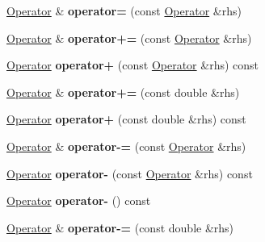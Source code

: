 \begin{DoxyCompactItemize}
\item 
\hypertarget{classOperator_afad114ba9dee8b9c08af0b5d27c3ba86}{\hyperlink{classOperator}{Operator} \& {\bfseries operator=} (const \hyperlink{classOperator}{Operator} \&rhs)}\label{classOperator_afad114ba9dee8b9c08af0b5d27c3ba86}

\item 
\hypertarget{classOperator_a0b20b0fedb0f49c4a2e69507cdcb540b}{\hyperlink{classOperator}{Operator} \& {\bfseries operator+=} (const \hyperlink{classOperator}{Operator} \&rhs)}\label{classOperator_a0b20b0fedb0f49c4a2e69507cdcb540b}

\item 
\hypertarget{classOperator_a67d89d71379a609aa018178afe1adb8d}{\hyperlink{classOperator}{Operator} {\bfseries operator+} (const \hyperlink{classOperator}{Operator} \&rhs) const }\label{classOperator_a67d89d71379a609aa018178afe1adb8d}

\item 
\hypertarget{classOperator_a9a57611d543bbf50e21bd81f94925dab}{\hyperlink{classOperator}{Operator} \& {\bfseries operator+=} (const double \&rhs)}\label{classOperator_a9a57611d543bbf50e21bd81f94925dab}

\item 
\hypertarget{classOperator_ae725e82c115d39c8688df372e99c78e0}{\hyperlink{classOperator}{Operator} {\bfseries operator+} (const double \&rhs) const }\label{classOperator_ae725e82c115d39c8688df372e99c78e0}

\item 
\hypertarget{classOperator_a1235ee7e0ba5220a831ac0c01b2210b9}{\hyperlink{classOperator}{Operator} \& {\bfseries operator-\/=} (const \hyperlink{classOperator}{Operator} \&rhs)}\label{classOperator_a1235ee7e0ba5220a831ac0c01b2210b9}

\item 
\hypertarget{classOperator_ac25a9769a621623062b922cb9a40a489}{\hyperlink{classOperator}{Operator} {\bfseries operator-\/} (const \hyperlink{classOperator}{Operator} \&rhs) const }\label{classOperator_ac25a9769a621623062b922cb9a40a489}

\item 
\hypertarget{classOperator_aa06ee3d5828d7bc43b3aca693ac0ef25}{\hyperlink{classOperator}{Operator} {\bfseries operator-\/} () const }\label{classOperator_aa06ee3d5828d7bc43b3aca693ac0ef25}

\item 
\hypertarget{classOperator_a6e1ad8f778a9026e47493aaffbe1ca20}{\hyperlink{classOperator}{Operator} \& {\bfseries operator-\/=} (const double \&rhs)}\label{classOperator_a6e1ad8f778a9026e47493aaffbe1ca20}


\end{DoxyCompactItemize}
